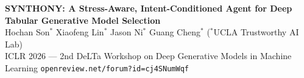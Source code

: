\documentclass[8pt]{article}
\begin{document}

\noindent\colorbox{UCLADark}{\begin{minipage}{\dimexpr\linewidth-2\fboxsep}
  \vspace{2pt}
  \centering
  {\color{white}\normalsize\textbf{SYNTHONY: A Stress-Aware, Intent-Conditioned Agent for Deep Tabular Generative Model Selection}}\\[1pt]
  {\color{white}\small
    Hochan Son$^*$ \enspace Xiaofeng Lin$^*$ \enspace Jason Ni$^*$ \enspace Guang Cheng$^*$ \enspace
    {\color{UCLAGold!90}\small($^*$UCLA Trustworthy AI Lab)}}\\[0.5pt]
  {\color{UCLAGold}\footnotesize
    ICLR 2026 — 2nd DeLTa Workshop on Deep Generative Models in Machine Learning \quad
    \texttt{openreview.net/forum?id=cj4SNumWqf}}
  \vspace{2pt}
\end{minipage}}

\vspace{2pt}
\end{document}
